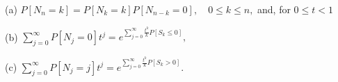 (a) $P[N_n = k] = P[N_k = k]P[N_{n-k} = 0], \quad 0 \leq k \leq n,$ and, for $0 \leq t < 1$

(b) $\sum_{j=0}^{\infty} P[N_j = 0]t^j = e^{\sum_{j=0}^{\infty} \frac{t^k}{k}P[S_k \leq 0]},$

(c) $\sum_{j=0}^{\infty} P[N_j = j]t^j = e^{\sum_{j=0}^{\infty} \frac{t^k}{k}P[S_k > 0]}.$